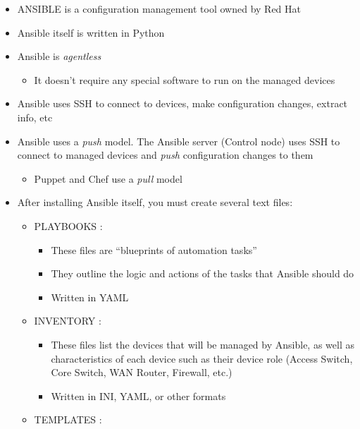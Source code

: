 \begin{itemize}
\tightlist
\item
  ANSIBLE is a configuration management tool owned by Red Hat
\item
  Ansible itself is written in Python
\item
  Ansible is \emph{agentless}

  \begin{itemize}
  \tightlist
  \item
    It doesn't require any special software to run on the managed
    devices
  \end{itemize}
\item
  Ansible uses SSH to connect to devices, make configuration changes,
  extract info, etc
\item
  Ansible uses a \emph{push} model. The Ansible server (Control node)
  uses SSH to connect to managed devices and \emph{push} configuration
  changes to them

  \begin{itemize}
  \tightlist
  \item
    Puppet and Chef use a \emph{pull} model
  \end{itemize}
\item
  After installing Ansible itself, you must create several text files:

  \begin{itemize}
  \tightlist
  \item
    PLAYBOOKS :

    \begin{itemize}
    \tightlist
    \item
      These files are ``blueprints of automation tasks''
    \item
      They outline the logic and actions of the tasks that Ansible
      should do
    \item
      Written in YAML
    \end{itemize}
  \item
    INVENTORY :

    \begin{itemize}
    \tightlist
    \item
      These files list the devices that will be managed by Ansible, as
      well as characteristics of each device such as their device role
      (Access Switch, Core Switch, WAN Router, Firewall, etc.)
    \item
      Written in INI, YAML, or other formats
    \end{itemize}
  \item
    TEMPLATES :


\end{itemize}
\end{itemize}
